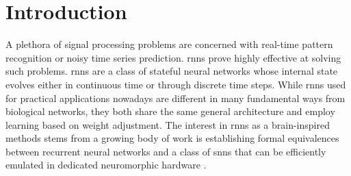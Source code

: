 \documentclass[journal,onecolumn,11pt]{IEEEtran}
\begin{document}
\section{Introduction}
A plethora of signal processing problems are concerned with real-time pattern recognition or noisy time series prediction.
\glspl{rnn} prove highly effective \cite{Goodfellow_etal16_deeplear} at solving such problems. 
\glspl{rnn} are a class of stateful neural networks whose internal state evolves either in continuous time or through discrete time steps.
While \glspl{rnn} used for practical applications nowadays are different in many fundamental ways from biological networks, they both share the same general architecture and employ learning based on weight adjustment.
%
The interest in \glspl{rnn} as a brain-inspired methods stems from a growing body of work is establishing formal equivalences between recurrent neural networks and a class of \glspl{snn} that can be efficiently emulated in dedicated neuromorphic hardware \cite{zenke_superspike:_2018,Wozniak_etal18_deepnetw,Neftci18_datapowe,Bellec_etal18_longshor}. 
\end{document}
